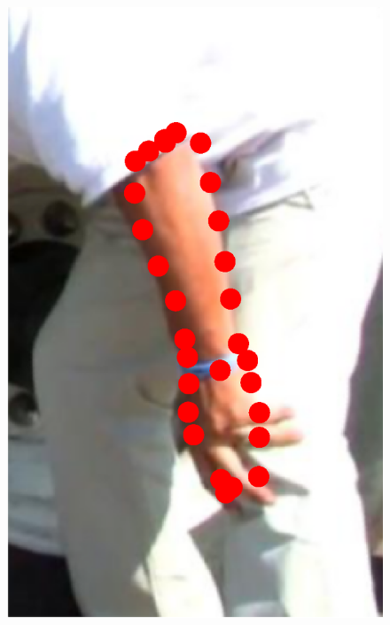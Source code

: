 \begin{figure}[!t]
    \includegraphics[height=\ofh]{resources/Annotation_Correction/Suplementory_Meterial/ExFit/0012.eps}
    \hfill

\end{figure}
